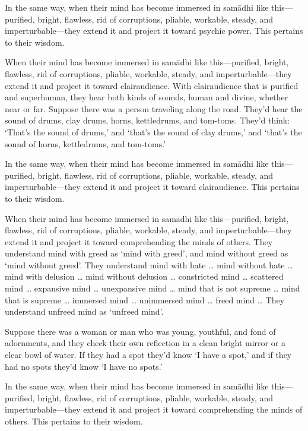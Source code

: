 \documentclass[12pt,openany]{book}%
\begin{document}
In the same way, when their mind has become immersed in \textsanskrit{samādhi} like this—purified, bright, flawless, rid of corruptions, pliable, workable, steady, and imperturbable—they extend it and project it toward psychic power. This pertains to their wisdom. 

When their mind has become immersed in \textsanskrit{samādhi} like this—purified, bright, flawless, rid of corruptions, pliable, workable, steady, and imperturbable—they extend it and project it toward clairaudience. With clairaudience that is purified and superhuman, they hear both kinds of sounds, human and divine, whether near or far. Suppose there was a person traveling along the road. They’d hear the sound of drums, clay drums, horns, kettledrums, and tom-toms. They’d think: ‘That’s the sound of drums,’ and ‘that’s the sound of clay drums,’ and ‘that’s the sound of horns, kettledrums, and tom-toms.’ 

In the same way, when their mind has become immersed in \textsanskrit{samādhi} like this—purified, bright, flawless, rid of corruptions, pliable, workable, steady, and imperturbable—they extend it and project it toward clairaudience. This pertains to their wisdom. 

When their mind has become immersed in \textsanskrit{samādhi} like this—purified, bright, flawless, rid of corruptions, pliable, workable, steady, and imperturbable—they extend it and project it toward comprehending the minds of others. They understand mind with greed as ‘mind with greed’, and mind without greed as ‘mind without greed’. They understand mind with hate … mind without hate … mind with delusion … mind without delusion … constricted mind … scattered mind … expansive mind … unexpansive mind … mind that is not supreme … mind that is supreme … immersed mind … unimmersed mind … freed mind … They understand unfreed mind as ‘unfreed mind’. 

Suppose there was a woman or man who was young, youthful, and fond of adornments, and they check their own reflection in a clean bright mirror or a clear bowl of water. If they had a spot they’d know ‘I have a spot,’ and if they had no spots they’d know ‘I have no spots.’ 

In the same way, when their mind has become immersed in \textsanskrit{samādhi} like this—purified, bright, flawless, rid of corruptions, pliable, workable, steady, and imperturbable—they extend it and project it toward comprehending the minds of others. This pertains to their wisdom. 
\end{document}
